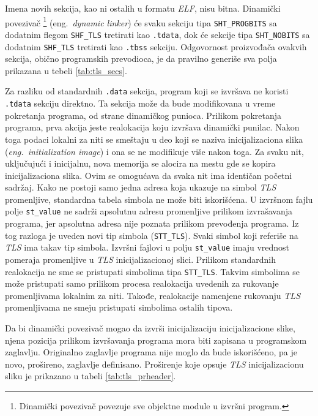 \documentclass[12pt,oneside]{memoir}
\begin{document}
Imena novih sekcija, kao ni ostalih u formatu \emph{ELF}, nisu bitna. Dinamički povezivač \footnote{Dinamički povezivač povezuje sve objektne module u izvršni program.} (eng.~\emph{dynamic linker}) će svaku sekciju tipa \texttt{SHT\_PROGBITS} sa dodatnim flegom \texttt{SHF\_TLS} tretirati kao \texttt{.tdata}, dok će sekcije tipa \texttt{SHT\_NOBITS} sa dodatnim \texttt{SHF\_TLS} tretirati kao \texttt{.tbss} sekciju. Odgovornost proizvođača ovakvih sekcija, obično programskih prevodioca, je da pravilno generiše sva polja prikazana u tebeli \ref{tab:tls_secs}.

Za razliku od standardnih \texttt{.data} sekcija, program koji se izvršava ne koristi \texttt{.tdata} sekciju direktno.  Ta sekcija može da bude modifikovana u vreme pokretanja programa, od strane dinamičkog punioca. Prilikom pokretanja programa, prva akcija jeste realokacija koju izvršava dinamički punilac. Nakon toga podaci lokalni za niti se smeštaju u deo koji se naziva inicijalizaciona slika (\emph{eng.~initialization image}) i ona se ne modifikuje više nakon toga. Za svaku nit, uključujući i inicijalnu, nova memorija se alocira na mestu gde se kopira inicijalizaciona slika. Ovim se omogućava da svaka nit ima identičan početni sadržaj. Kako ne postoji samo jedna adresa koja ukazuje na simbol \emph{TLS} promenljive, standardna tabela simbola ne može biti iskorišćena. U izvršnom fajlu polje \texttt{st\_value} ne sadrži apsolutnu adresu promenljive prilikom izvrašavanja programa, jer apsolutna adresa nije poznata prilikom prevođenja programa. Iz tog razloga  je uveden novi tip simbola (\texttt{STT\_TLS}). Svaki simbol koji referiše na \emph{TLS} ima takav tip simbola. Izvršni fajlovi u polju \texttt{st\_value} imaju vrednost pomeraja promenljive u \emph{TLS} inicijalizacionoj slici.
Prilikom standardnih realokacija ne sme se pristupati simbolima tipa \texttt{STT\_TLS}. Takvim simbolima se može pristupati samo prilikom procesa realokacija uvedenih za rukovanje promenljivama lokalnim za niti. Takođe, realokacije namenjene rukovanju \emph{TLS} promenljivama ne smeju pristupati simbolima ostalih tipova.

Da bi dinamički povezivač mogao da izvrši inicijalizaciju inicijalizacione slike, njena pozicija prilikom izvršavanja programa mora biti zapisana u programskom zaglavlju. Originalno zaglavlje programa nije moglo da bude iskorišćeno, pa je novo, prošireno, zaglavlje definisano. Proširenje koje opsuje \emph{TLS} inicijalizacionu sliku je prikazano u tabeli \ref{tab:tls_prheader}.
\end{document}

